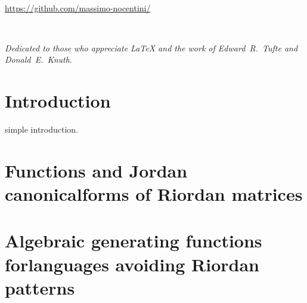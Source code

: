 \documentclass[nopart]{tufte-book}
\newcommand{\monthyear}{%
  \ifcase\month\or January\or February\or March\or April\or May\or June\or
  July\or August\or September\or October\or November\or
  December\fi\space\number\year
}
\begin{document}
\fi

\newpage
\begin{fullwidth}
~\vfill
\thispagestyle{empty}
\setlength{\parindent}{0pt}
\setlength{\parskip}{\baselineskip}

\par{\url{https://github.com/massimo-nocentini/}}
\end{fullwidth}

\tableofcontents

\listoffigures

\listoftables

\cleardoublepage
~\vfill
\begin{doublespace}
\noindent\fontsize{18}{22}\selectfont\itshape
\nohyphenation
Dedicated to those who appreciate \LaTeX{}
and the work of \mbox{Edward R.~Tufte}
and \mbox{Donald E.~Knuth}.
\end{doublespace}
\vfill
\vfill


\cleardoublepage
\chapter*{Introduction}

simple introduction.


\mainmatter


\chapter{Functions and Jordan canonical\newline forms of Riordan matrices}
\label{ch:Riordan-matrices-function}



\chapter{Algebraic generating functions for\newline languages avoiding Riordan patterns}
\label{ch:algebraic-gfs-languages-avoiding-Riordan-patterns}
\end{document}
